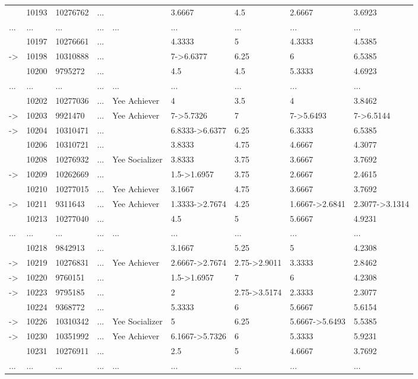 \documentclass[6pt,a4paper]{article}
\begin{document}
\begin{landscape}
{\begin{longtable}{lllllllll}
&10193&10276762&...&&3.6667&4.5&2.6667&3.6923\tabularnewline
...&...&...&...&...&...&...&...&...\tabularnewline
&10197&10276661&...&&4.3333&5&4.3333&4.5385\tabularnewline
-\textgreater &10198&10310888&...&&7-\textgreater 6.6377&6.25&6&6.5385\tabularnewline
&10200&9795272&...&&4.5&4.5&5.3333&4.6923\tabularnewline
...&...&...&...&...&...&...&...&...\tabularnewline
&10202&10277036&...&Yee Achiever&4&3.5&4&3.8462\tabularnewline
-\textgreater &10203&9921470&...&Yee Achiever&7-\textgreater 5.7326&7&7-\textgreater 5.6493&7-\textgreater 6.5144\tabularnewline
-\textgreater &10204&10310471&...&&6.8333-\textgreater 6.6377&6.25&6.3333&6.5385\tabularnewline
&10206&10310721&...&&3.8333&4.75&4.6667&4.3077\tabularnewline
&10208&10276932&...&Yee Socializer&3.8333&3.75&3.6667&3.7692\tabularnewline
-\textgreater &10209&10262669&...&&1.5-\textgreater 1.6957&3.75&2.6667&2.4615\tabularnewline
&10210&10277015&...&Yee Achiever&3.1667&4.75&3.6667&3.7692\tabularnewline
-\textgreater &10211&9311643&...&Yee Achiever&1.3333-\textgreater 2.7674&4.25&1.6667-\textgreater 2.6841&2.3077-\textgreater 3.1314\tabularnewline
&10213&10277040&...&&4.5&5&5.6667&4.9231\tabularnewline
...&...&...&...&...&...&...&...&...\tabularnewline
&10218&9842913&...&&3.1667&5.25&5&4.2308\tabularnewline
-\textgreater &10219&10276831&...&Yee Achiever&2.6667-\textgreater 2.7674&2.75-\textgreater 2.9011&3.3333&2.8462\tabularnewline
-\textgreater &10220&9760151&...&&1.5-\textgreater 1.6957&7&6&4.2308\tabularnewline
-\textgreater &10223&9795185&...&&2&2.75-\textgreater 3.5174&2.3333&2.3077\tabularnewline
&10224&9368772&...&&5.3333&6&5.6667&5.6154\tabularnewline
-\textgreater &10226&10310342&...&Yee Socializer&5&6.25&5.6667-\textgreater 5.6493&5.5385\tabularnewline
-\textgreater &10230&10351992&...&Yee Achiever&6.1667-\textgreater 5.7326&6&5.3333&5.9231\tabularnewline
&10231&10276911&...&&2.5&5&4.6667&3.7692\tabularnewline
...&...&...&...&...&...&...&...&...\tabularnewline
\hline
\end{longtable}}

\end{landscape}
\end{document}
